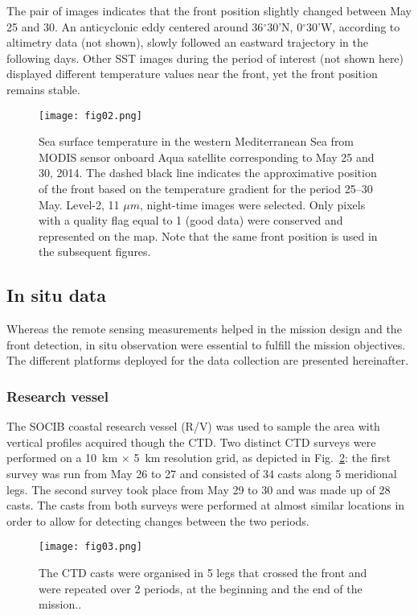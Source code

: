 \documentclass[essd]{copernicus}
\begin{document}
The pair of images indicates that the front position slightly changed between May 25 and 30. An anticyclonic eddy centered around 36$^{\circ}$30'N, 0$^{\circ}$30'W, according to altimetry data (not shown), slowly followed an eastward trajectory in the following days. Other SST images during the period of interest (not shown here) displayed different temperature values near the front, yet the front position remains stable. 

\begin{figure}[t]
\texttt{[image: fig02.png]}
\caption{Sea surface temperature in the western Mediterranean Sea from MODIS sensor onboard Aqua satellite corresponding to May 25 and 30, 2014. The dashed black line indicates the approximative position of the front based on the temperature gradient for the period 25--30 May. Level-2, 11 $\mu m$, night-time images were selected. Only pixels with a quality flag equal to 1 (good data) were conserved and represented on the map. Note that the same front position is used in the subsequent figures.\label{fig2:SST}}
\end{figure}

\subsection{In situ data}

Whereas the remote sensing measurements helped in the mission design and the front detection, in situ observation were essential to fulfill the mission objectives. The different platforms deployed for the data collection are presented hereinafter.

\subsubsection{Research vessel}

The SOCIB coastal research vessel (R/V) was used to sample the area with vertical profiles acquired though the CTD. Two distinct CTD surveys were performed on a 10~km $\times$ 5~km resolution grid, as depicted in Fig.~\ref{fig3:CTD}: the first survey was run from May 26 to 27 and consisted of 34 casts along 5 meridional legs. The second survey took place from May 29 to 30 and was made up of 28 casts. The casts from both surveys were performed at almost similar locations in order to allow for detecting changes between the two periods. 

\begin{figure}[t]
\texttt{[image: fig03.png]}
\caption{The CTD casts were organised in 5 legs that crossed the front and were repeated over 2 periods, at the beginning and the end of the mission.\label{fig3:CTD}.}
\end{figure}
\end{document}
